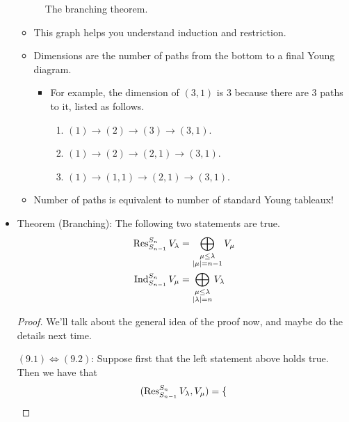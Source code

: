 \documentclass[../notes.tex]{subfiles}
\begin{document}
\begin{itemize}
\begin{figure}[h!]
        \caption{The branching theorem.}
        \label{fig:branchingTrm}
    \end{figure}
    \begin{itemize}
        \item This graph helps you understand induction and restriction.
        \item Dimensions are the number of paths from the bottom to a final Young diagram.
        \begin{itemize}
            \item For example, the dimension of $(3,1)$ is 3 because there are 3 paths to it, listed as follows.
            \begin{enumerate}
                \item $(1)\to(2)\to(3)\to(3,1)$.
                \item $(1)\to(2)\to(2,1)\to(3,1)$.
                \item $(1)\to(1,1)\to(2,1)\to(3,1)$.
            \end{enumerate}
        \end{itemize}
        \item Number of paths is equivalent to number of standard Young tableaux!
    \end{itemize}
    \item Theorem (Branching): The following two statements are true.
    \begin{align}
        \operatorname{Res}_{S_{n-1}}^{S_n}V_\lambda &= \bigoplus_{\substack{\mu\leq\lambda\\|\mu|=n-1}}V_\mu\\
        \operatorname{Ind}_{S_{n-1}}^{S_n}V_\mu &= \bigoplus_{\substack{\mu\leq\lambda\\|\lambda|=n}}V_\lambda
    \end{align}
    \begin{proof}
        We'll talk about the general idea of the proof now, and maybe do the details next time.\par
        \underline{$(9.1)\Longleftrightarrow(9.2)$}: Suppose first that the left statement above holds true. Then we have that
        \begin{equation*}
            (\operatorname{Res}_{S_{n-1}}^{S_n}V_\lambda,V_\mu) =
            \begin{cases}

\end{cases}
\end{equation*}
\end{proof}
\end{itemize}
\end{document}
